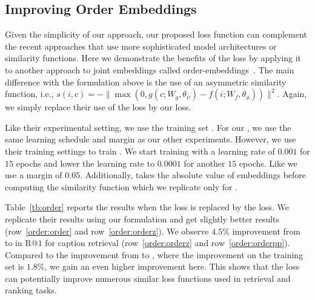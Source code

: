 \subsection{Improving Order Embeddings}
\label{sec:order}



Given the simplicity of our approach, our proposed loss function can complement 
the recent approaches that use more sophisticated model architectures or 
similarity functions. Here we demonstrate the benefits of the \MAX{} loss by 
applying it to another approach to joint embeddings called 
order-embeddings~\cite{vendrov2015order}.  The main difference with the 
formulation above is the use of an asymmetric similarity function, i.e., 
$s(i,c)=-\|\max(0, g(c; W_g, \theta_\psi) - f(i; W_f, \theta_\phi)) \|^2$.  
Again, we simply replace their use of the \SUM{} loss by our \MAX{} loss.

Like their experimental setting, we use the training set \TCV{}.  For our 
\orderpp{}, we use the same learning schedule and margin as our other 
experiments.  However, we use their training settings to train \orderz{}. 
We start training with a learning rate of $0.001$ for $15$ epochs 
and lower the learning rate to $0.0001$ for another $15$ epochs. 
Like \cite{vendrov2015order} we use a margin of $0.05$.  
Additionally, \cite{vendrov2015order} takes the absolute value of 
embeddings before computing the similarity function which we replicate 
only for \orderz{}.

Table~\ref{tb:order} reports the results when the \SUM{} loss 
is replaced by the \MAX{} loss.  We replicate their results using 
our \orderz{} formulation and get slightly better results 
(row~\ref{order:order} and row~\ref{order:orderz}). We observe $4.5\%$ 
improvement from \orderz{} to \orderpp{} in R@$1$ for caption retrieval 
(row~\ref{order:orderz} and row~\ref{order:orderpp}).  Compared to the 
improvement from \VSEz{} to \VSEpp{}, where the improvement on the \TCV{} 
training set is $1.8\%$, we gain an even higher improvement here.
This shows  that the \MAX{} loss can potentially improve numerous similar 
loss functions used in retrieval and ranking tasks.


